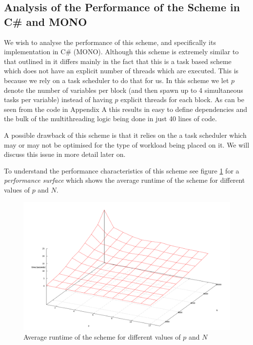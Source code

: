\subsection{Analysis of the Performance of the Scheme in C\# and MONO}

We wish to analyse the performance of this scheme, and specifically its implementation in C\# (MONO). Although this scheme is extremely similar to that outlined in \cite{Diethelm2011} it differs mainly in the fact that this is a task based scheme which does not have an explicit number of threads which are executed. This is because we rely on a task scheduler to do that for us. In this scheme we let $ p $ denote the number of variables per block (and then spawn up to 4 simultaneous tasks per variable) instead of having $ p $ explicit threads for each block. 
As can be seen from the code in Appendix A this results in easy to define dependencies and the bulk of the multithreading logic being done in just 40 lines of code.

A possible drawback of this scheme is that it relies on the a task scheduler which may or may not be optimised for the type of workload being placed on it. We will discuss this issue in more detail later on.

To understand the performance characteristics of this scheme see figure \ref{fig:mono_performance_surface} for a \emph{performance surface} which shows the average runtime of the scheme for different values of $ p $ and $ N $.

\begin{figure}[H]
    \includegraphics[scale = 0.3]{images/Dot_Net_Performance_No_Label}
    \caption{Average runtime of the scheme for different values of $ p $ and $ N $}
    \label{fig:mono_performance_surface}
\end{figure}

